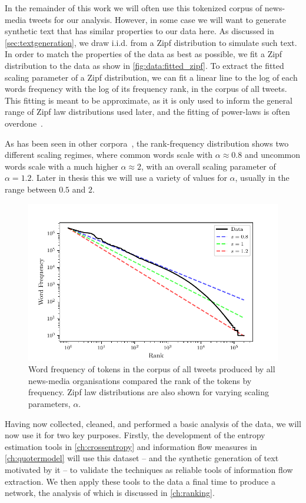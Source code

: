 In the remainder of this work we will often use this tokenized corpus of news-media tweets for our analysis. However, in some case we will want to generate synthetic text that has similar properties to our data here. As discussed in \autoref{sec:textgeneration}, we draw i.i.d. from a Zipf distribution to simulate such text. In order to match the properties of the data as best as possible, we fit a Zipf distribution to the data as show in \autoref{fig:data:fitted_zipf}. To extract the fitted scaling parameter of a Zipf distribution, we can fit a linear line to the log of each words frequency with the log of its frequency rank, in the corpus of all tweets. This fitting is meant to be approximate, as it is only used to inform the general range of Zipf law distributions used later, and the fitting of power-laws is often overdone~\cite{broidoScalefreeNetworksAre2019}. 

As has been seen in other corpora~\cite{williams_text_2015}, the rank-frequency distribution shows two different scaling regimes, where common words scale with $\alpha\approx 0.8$ and uncommon words scale with a much higher $\alpha \approx 2$, with an overall scaling parameter of $\alpha=1.2$. Later in thesis this we will use a variety of values for $\alpha$, usually in the range between $0.5$ and $2$.


\begin{figure}[!htbp]
\centering
\includegraphics{chapter1/figs/fitted_zipf.pdf}
\caption{Word frequency of tokens in the corpus of all tweets produced by all news-media organisations compared the rank of the tokens by frequency. Zipf law distributions are also shown for varying scaling parameters, $\alpha$. \label{fig:data:fitted_zipf}}
\end{figure} 


Having now collected, cleaned, and performed a basic analysis of the data, we will now use it for two key purposes. Firstly, the development of the entropy estimation tools in \autoref{ch:crossentropy} and information flow measures in \autoref{ch:quotermodel} will use this dataset -- and the synthetic generation of text motivated by it -- to validate the techniques as reliable tools of information flow extraction. We then apply these tools to the data a final time to produce a network, the analysis of which is discussed in \autoref{ch:ranking}.


%
